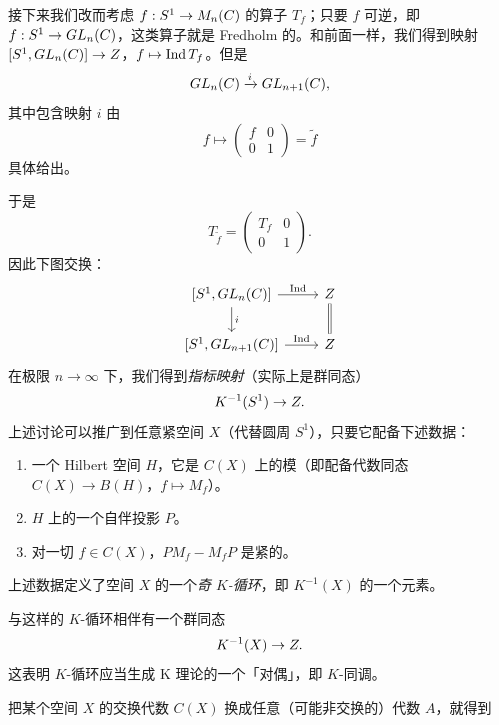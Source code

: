 
接下来我们改而考虑 $f: S^1\to M_n(C)$ 的算子 $T_f$；只要 $f$ 可逆，即 $f: S^1\to GL_n(C)$，这类算子就是 Fredholm 的。和前面一样，我们得到映射 $[S^1,GL_n(C)]\to Z$，$f\mapsto\operatorname{Ind} T_f$。但是
\[ GL_n(C)\xrightarrow{i}GL_{n+1}(C), \]
其中包含映射 $i$ 由
\[ f\mapsto \begin{pmatrix} f & 0 \\ 0 & 1\end{pmatrix}=\tilde f \]
具体给出。

于是
\[ T_{\tilde f}=\begin{pmatrix} T_f & 0 \\ 0 & 1\end{pmatrix}. \]
因此下图交换：
\[
\begin{tikzcd}
{[S^1,\GL_n(\C)]} \arrow[r,"\ind"] \arrow[d,"i"] & \Z \arrow[d,equal] \\
{[S^1,\GL_{n+1}(\C)]} \arrow[r,"\ind"] & \Z
\end{tikzcd}
\]
在极限 $n\to\infty$ 下，我们得到\emph{指标映射}（实际上是群同态）
\[ K^{-1}(S^1)\to Z. \]
上述讨论可以推广到任意紧空间 $X$（代替圆周 $S^1$），只要它配备下述数据：

\begin{enumerate}[label=\alph*.]
\item 一个 Hilbert 空间 $H$，它是 $C(X)$ 上的模（即配备代数同态 $C(X)\to B(H)$，$f\mapsto M_f$）。
\item $H$ 上的一个自伴投影 $P$。
\item 对一切 $f\in C(X)$，$PM_f-M_fP$ 是紧的。
\end{enumerate}

上述数据定义了空间 $X$ 的一个\emph{奇 $K$-循环}，即 $K^{-1}(X)$ 的一个元素。

与这样的 $K$-循环相伴有一个群同态
\[ K^{-1}(X)\to Z. \]
这表明 $K$-循环应当生成 K 理论的一个「对偶」，即 $K$-同调。


 把某个空间 $X$ 的交换代数 $C(X)$ 换成任意（可能非交换的）代数 $A$，就得到


